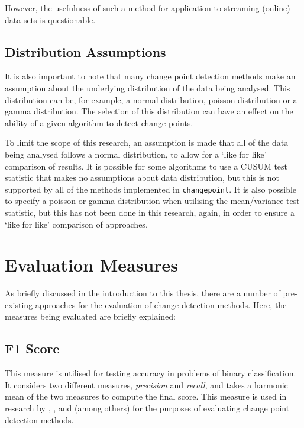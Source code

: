 \documentclass[../main.tex]{subfiles}
\begin{document}
However, the usefulness of such a method for application to streaming (online) data sets is questionable.


\subsection{Distribution Assumptions}

It is also important to note that many change point detection methods make an assumption about the underlying distribution of the data being analysed. This distribution can be, for example, a normal distribution, poisson distribution or a gamma distribution. The selection of this distribution can have an effect on the ability of a given algorithm to detect change points.

To limit the scope of this research, an assumption is made that all of the data being analysed follows a normal distribution, to allow for a `like for like' comparison of results. It is possible for some algorithms to use a CUSUM test statistic that makes no assumptions about data distribution, but this is not supported by all of the methods implemented in \texttt{changepoint}. It is also possible to specify a poisson or gamma distribution when utilising the mean/variance test statistic, but this has not been done in this research, again, in order to ensure a `like for like' comparison of approaches.

\section{Evaluation Measures}

As briefly discussed in the introduction to this thesis, there are a number of pre-existing approaches for the evaluation of change detection methods. Here, the measures being evaluated are briefly explained:

\subsection{F1 Score}

This measure is utilised for testing accuracy in problems of binary classification. It considers two different measures, \emph{precision} and \emph{recall}, and takes a harmonic mean of the two measures to compute the final score. This measure is used in research by \citeauthor{Qahtan2015} \cite{Qahtan2015}, \citeauthor{Buntain2014} \cite{Buntain2014}, and \citeauthor{Pelecanos2010} \cite{Pelecanos2010} (among others) for the purposes of evaluating change point detection methods.
	
\end{document}
